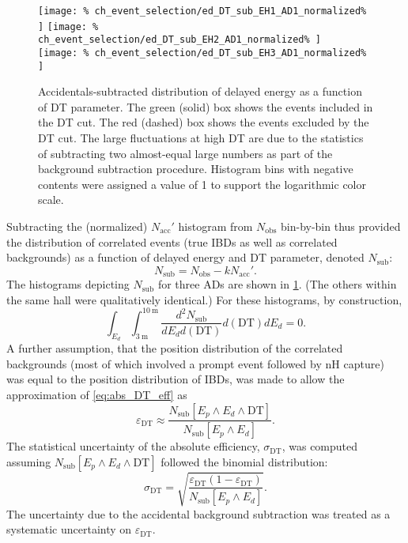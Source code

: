 \begin{figure}
    \centering
    \texttt{[image: \%
        ch\_event\_selection/ed\_DT\_sub\_EH1\_AD1\_normalized\%
    ]}
    \texttt{[image: \%
        ch\_event\_selection/ed\_DT\_sub\_EH2\_AD1\_normalized\%
    ]} \\
    \texttt{[image: \%
        ch\_event\_selection/ed\_DT\_sub\_EH3\_AD1\_normalized\%
    ]}
    \caption[Delayed energy vs. DT without accidentals]{
        Accidentals-subtracted distribution of
        delayed energy as a function of DT parameter.
        The green (solid) box shows the events included in the DT cut.
        The red (dashed) box shows the events excluded by the DT cut.
        The large fluctuations at high DT are due to the statistics
        of subtracting two almost-equal large numbers as part of the
        background subtraction procedure.
        Histogram bins with negative contents were assigned a value of 1
        to support the logarithmic color scale.
    }
    \label{fig:ed_DT_sub}
\end{figure}

Subtracting the (normalized) $N_\text{acc}'$ histogram from $N_\text{obs}$ bin-by-bin
thus provided the distribution of correlated events
(true IBDs as well as correlated backgrounds)
as a function of delayed energy and DT parameter,
denoted $N_\text{sub}$:
\begin{equation}\label{eq:DT_eff_nsub}
    N_\text{sub} = N_\text{obs} - kN_\text{acc}'.
\end{equation}
The histograms depicting $N_\text{sub}$ for three ADs
are shown in \cref{fig:ed_DT_sub}.
(The others within the same hall were qualitatively identical.)
For these histograms, by construction,
\begin{equation}\label{eq:acc_sub_normalized_zero}
    \int_{E_d}\int_{\SI{3}{\m}}^{\SI{10}{\m}}
    \frac{d^2N_\text{sub}}{dE_d d(\text{DT})}
    d(\text{DT}) dE_d
    = 0.
\end{equation}
A further assumption, that the position distribution of the correlated backgrounds
(most of which involved a prompt event followed by nH capture)
was equal to the position distribution of IBDs,
was made to allow the approximation of \cref{eq:abs_DT_eff} as
\begin{equation}\label{eq:abs_DT_eff_approx}
    \varepsilon_{\text{DT}} \approx \frac{
        N_\text{sub}[E_p \wedge E_d \wedge \text{DT}]
    }%
    {
        N_\text{sub}[E_p \wedge E_d]
    }.
\end{equation}
The statistical uncertainty of the absolute efficiency, $\sigma_\text{DT}$,
was computed assuming $N_\text{sub}[E_p \wedge E_d \wedge \text{DT}]$
followed the binomial distribution:
\begin{equation}\label{eq:abs_DT_eff_uncertainty}
    \sigma_\text{DT} = \sqrt{
        \frac{
            \varepsilon_\text{DT}(1 - \varepsilon_\text{DT})
        }{
            N_\text{sub}[E_p \wedge E_d]
        }
    }.
\end{equation}
The uncertainty due to the accidental background subtraction
was treated as a systematic uncertainty on $\varepsilon_\text{DT}$.


